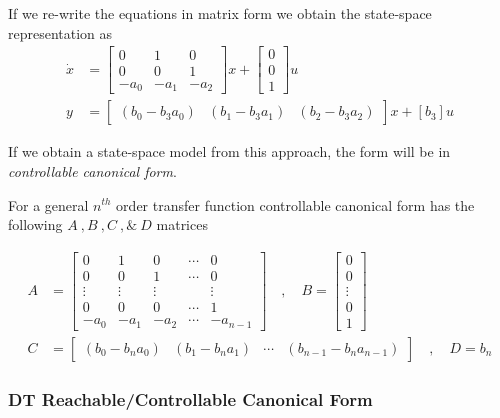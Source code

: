 \documentclass[twoside]{article}
\begin{document}
%
If we re-write the equations in matrix form we obtain the state-space representation as
%
\begin{align*}
	\dot{x} &= \left[ \begin{array}{ccc} 0 & 1 & 0  \\  0 & 0 & 1 \\  -a_0 & -a_1 & -a_2 \end{array} \right] x 
	+ \left[ \begin{array}{c} 0 \\ 0 \\ 1 \end{array} \right] u
	\\
	y &= \left[ \begin{array}{ccc} ( b_0 - b_3 a_0 ) & ( b_1 - b_3 a_1 )  & ( b_2 - b_3 a_2 ) \end{array} \right] x
	+ \left[ b_3 \right] u
\end{align*}

If we obtain a state-space model from this approach, the form
will be in \textit{controllable canonical form}.  

For a general $n^{th}$ order transfer function controllable
canonical form has the following $A \ ,  B \ ,  C \ , \& \ D$
matrices

\begin{align*}
A &= \left[ \begin{array}{ccccc} 0 & 1 & 0 & \cdots & 0 \\ 0 & 0 & 1 &
                                                                      \cdots & 0
\\ \vdots & \vdots & \vdots & & \vdots
\\ 0 & 0 & 0 & \cdots & 1
    \\ -a_0 & -a_1 & -a_2 & \cdots & -a_{n-1} \end{array} \right]
\quad , \quad 
B = \left[ \begin{array}{c} 0\\ 0 \\ \vdots \\ 0
    \\ 1 \end{array} \right]
\\ C &= \left[ \begin{array}{cccc} (b_0 - b_n a_0) 
  &  (b_1 - b_n a_1) & \cdots & (b_{n-1} - b_n a_{n-1}) \end{array} \right]
\quad , \quad
D = b_n
\end{align*}

\subsubsection{DT Reachable/Controllable Canonical Form}
\end{document}
